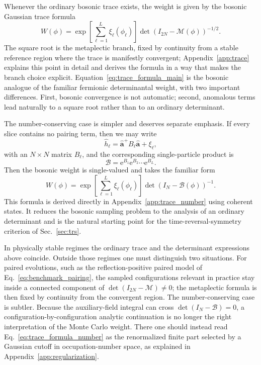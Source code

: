 \documentclass[twocolumn,aps,prb,10pt,amsmath,amssymb,amsthm,superscriptaddress]{revtex4-2}
\newcommand{\ee}{\mathrm{e}}
\newcommand{\mc}[1]{\mathcal{#1}}
\newcommand{\bb}[1]{\bm{#1}}
\theoremstyle{remark}
\begin{document}
Whenever the ordinary bosonic trace exists, the weight is given by the bosonic Gaussian trace formula
\begin{equation}
    W(\phi) = \exp\!\left[\sum_{\ell=1}^L \xi_\ell(\phi_\ell)\right]
    \det\!\left(I_{2N}-\mc M\left(\phi\right)\right)^{-1/2}.
    \label{eq:trace_formula_main}
\end{equation}
The square root is the metaplectic branch, fixed by continuity from a stable reference region where the trace is manifestly convergent; Appendix~\ref{app:trace} explains this point in detail and derives the formula in a way that makes the branch choice explicit. Equation~\eqref{eq:trace_formula_main} is the bosonic analogue of the familiar fermionic determinantal weight, with two important differences. First, bosonic convergence is not automatic; second, anomalous terms lead naturally to a square root rather than to an ordinary determinant.

The number-conserving case is simpler and deserves separate emphasis. If every slice contains no pairing term, then we may write
\begin{equation}
    \hat h_\ell = \hat{\bb a}^+ B_\ell \hat{\bb a} + \xi_\ell,
    \label{eq:number_conserving_slice}
\end{equation}
with an $N\times N$ matrix $B_\ell$, and the corresponding single-particle product is
\begin{equation}
    \mc B = \ee^{B_1}\ee^{B_2}\cdots\ee^{B_L}.
\end{equation}
Then the bosonic weight is single-valued and takes the familiar form
\begin{equation}
    W(\phi)=\exp\!\left[\sum_{\ell=1}^L \xi_\ell(\phi_\ell)\right]
    \det\!\left(I_N-\mc B(\phi)\right)^{-1}.
    \label{eq:trace_formula_number}
\end{equation}
This formula is derived directly in Appendix~\ref{app:trace_number} using coherent states. It reduces the bosonic sampling problem to the analysis of an ordinary determinant and is the natural starting point for the time-reversal-symmetry criterion of Sec.~\ref{sec:trs}.

In physically stable regimes the ordinary trace and the determinant expressions above coincide. Outside those regimes one must distinguish two situations. For paired evolutions, such as the reflection-positive paired model of Eq.~\eqref{eq:benchmark_pairing}, the sampled configurations relevant in practice stay inside a connected component of $\det(I_{2N}-\mc M)\neq 0$; the metaplectic formula is then fixed by continuity from the convergent region. The number-conserving case is subtler. Because the auxiliary-field integral can cross $\det(I_N-\mc B)=0$, a configuration-by-configuration analytic continuation is no longer the right interpretation of the Monte Carlo weight. There one should instead read Eq.~\eqref{eq:trace_formula_number} as the renormalized finite part selected by a Gaussian cutoff in occupation-number space, as explained in Appendix~\ref{app:regularization}.
\end{document}
